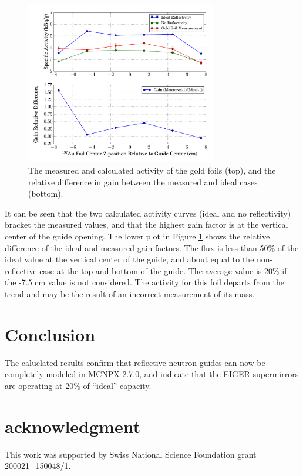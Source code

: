 \documentclass[a4paper,
              ]{jacow}
\begin{document}
\begin{figure}[!htb]
   \centering
   \includegraphics*[trim = 0mm 5mm 0mm 5mm, width=83mm]{THPF102f6.pdf}
   \caption{The measured and calculated activity of the gold foils (top), and the relative difference in gain between the measured and ideal cases (bottom).}
   \label{activation}
\end{figure}

It can be seen that the two calculated activity curves (ideal and no reflectivity) bracket the measured values, and that the highest gain factor is at the vertical center of the guide opening.  The lower plot in Figure \ref{activation} shows the relative difference of the ideal and measured gain factors.  The flux is less than 50\% of the ideal value at the vertical center of the guide, and about equal to the non-reflective case at the top and bottom of the guide.  The average value is 20\% if the -7.5 cm value is not considered.  The activity for this foil departs from the trend and may be the result of an incorrect measurement of its mass.


\section{Conclusion}

The caluclated results confirm that reflective neutron guides can now be completely modeled in MCNPX 2.7.0, and indicate that the EIGER supermirrors are operating at 20\% of ``ideal'' capacity.  

\section{acknowledgment}

This work was supported by Swiss National Science Foundation grant 200021\_150048/1.
\end{document}
